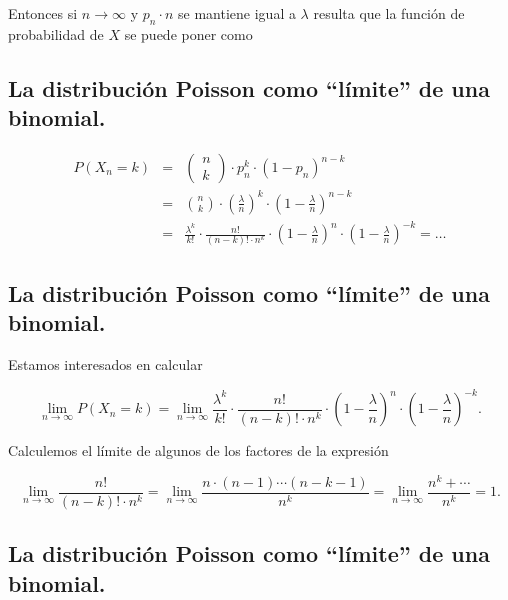 \documentclass[]{book}
\begin{document}
Entonces si \(n\to\infty\) y \(p_n\cdot n\) se mantiene igual a \(\lambda\) resulta que la función de probabilidad de \(X\) se puede poner como

\hypertarget{la-distribuciuxf3n-poisson-como-luxedmite-de-una-binomial.-3}{%
\subsection{La distribución Poisson como ``límite'' de una binomial.}\label{la-distribuciuxf3n-poisson-como-luxedmite-de-una-binomial.-3}}

\[
\begin{eqnarray*}
P(X_n=k)&=&\left(\begin{array}{c} n\\ k\end{array}\right) \cdot p_n^k\cdot  (1-p_n)^{n-k}
\\
&=& {n\choose k}\cdot \left(\frac{\lambda}{n}\right)^{k}\cdot \left(1-\frac{\lambda}{n}\right)^{n-k}\\
&=&
\frac{\lambda^k}{k!}\cdot\frac{n!}{(n-k)!\cdot n^k}\cdot
\left(1-\frac{\lambda}{n}\right)^{n}\cdot \left(1-\frac{\lambda}{n}\right)^{-k}=\ldots
\end{eqnarray*}
\]

\hypertarget{la-distribuciuxf3n-poisson-como-luxedmite-de-una-binomial.-4}{%
\subsection{La distribución Poisson como ``límite'' de una binomial.}\label{la-distribuciuxf3n-poisson-como-luxedmite-de-una-binomial.-4}}

Estamos interesados en calcular

\[
\displaystyle\lim_{n\to \infty} P(X_n=k) = \lim_{n\to \infty} \frac{\lambda^k}{k!}\cdot\frac{n!}{(n-k)!\cdot n^k} \cdot
\left(1-\frac{\lambda}{n}\right)^{n}\cdot \left(1-\frac{\lambda}{n}\right)^{-k}.
\]

Calculemos el límite de algunos de los factores de la expresión

\[
\displaystyle\lim_{n\to \infty}\frac{n!}{(n-k)!\cdot n^k}= \lim_{n\to \infty}\frac{n\cdot (n-1)\cdots (n-k-1)}{n^k}
=\lim_{n\to \infty}\frac{n^{k}+\cdots}{n^k}=1.
\]

\hypertarget{la-distribuciuxf3n-poisson-como-luxedmite-de-una-binomial.-5}{%
\subsection{La distribución Poisson como ``límite'' de una binomial.}\label{la-distribuciuxf3n-poisson-como-luxedmite-de-una-binomial.-5}}
\end{document}
